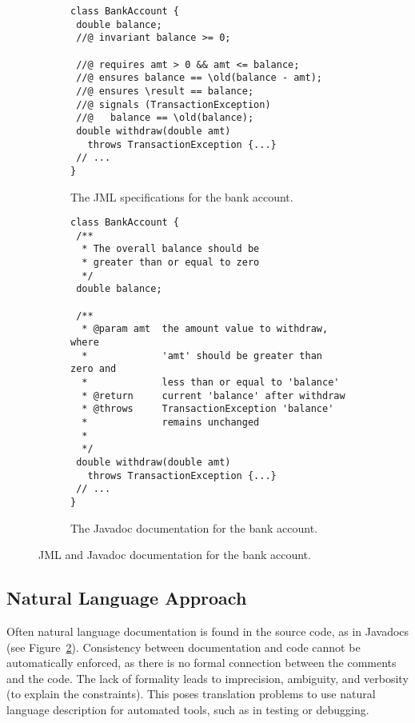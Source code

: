 \begin{figure*}
\centering
\begin{subfigure}{.48\textwidth}
\begin{lstlisting}[basicstyle=\footnotesize\ttfamily,name=figxpi]
class BankAccount {
 double balance;
 //@ invariant balance >= 0;

 //@ requires amt > 0 && amt <= balance;
 //@ ensures balance == \old(balance - amt);
 //@ ensures \result == balance;
 //@ signals (TransactionException) 
 //@   balance == \old(balance);
 double withdraw(double amt) 
   throws TransactionException {...}
 // ...
}
\end{lstlisting}
\caption{The JML specifications for the bank account.}
\label{Fig-JML-Bank}
\end{subfigure}%
\begin{subfigure}{.48\textwidth}
\begin{lstlisting}[basicstyle=\footnotesize\ttfamily,name=figxpi]
class BankAccount {
 /**
  * The overall balance should be
  * greater than or equal to zero
  */
 double balance;

 /**
  * @param amt  the amount value to withdraw, where
  *             'amt' should be greater than zero and
  *             less than or equal to 'balance'
  * @return     current 'balance' after withdraw
  * @throws     TransactionException 'balance' 
  *             remains unchanged
  *
  */
 double withdraw(double amt) 
   throws TransactionException {...}
 // ...
}
\end{lstlisting}
\caption{The Javadoc documentation for the bank account.}
\label{Fig-Javadoc-Bank}
\end{subfigure}
\caption{JML and Javadoc documentation for the bank account.}
\label{fig:test}
\end{figure*}


\subsection{Natural Language Approach}

Often natural language documentation
is found in the source code, as in Javadocs
(see Figure~\ref{Fig-Javadoc-Bank}).
Consistency between documentation and code cannot be automatically enforced, as there is
no formal connection between the comments and the code.
The lack of formality leads to imprecision, ambiguity, and verbosity (to explain the constraints).
This poses translation problems to use natural language description for automated tools, such as in testing or debugging.

